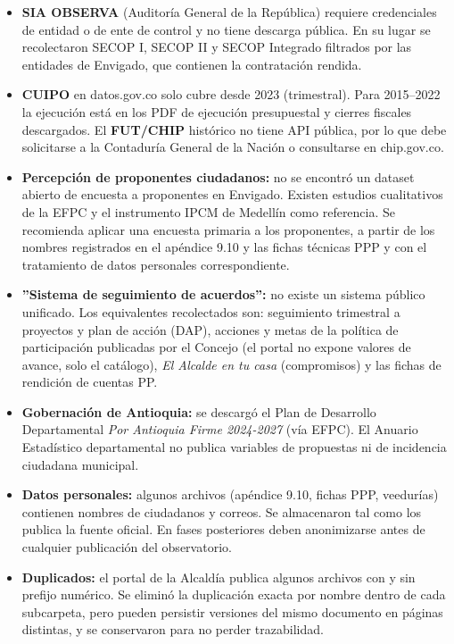 \documentclass[11pt,a4paper]{article}
\begin{document}
\begin{itemize}[leftmargin=*]
\item \textbf{SIA OBSERVA} (Auditoría General de la República) requiere credenciales de entidad o de ente de control y no tiene descarga pública. En su lugar se recolectaron SECOP I, SECOP II y SECOP Integrado filtrados por las entidades de Envigado, que contienen la contratación rendida.
\item \textbf{CUIPO} en datos.gov.co solo cubre desde 2023 (trimestral). Para 2015–2022 la ejecución está en los PDF de ejecución presupuestal y cierres fiscales descargados. El \textbf{FUT/CHIP} histórico no tiene API pública, por lo que debe solicitarse a la Contaduría General de la Nación o consultarse en chip.gov.co.
\item \textbf{Percepción de proponentes ciudadanos:} no se encontró un dataset abierto de encuesta a proponentes en Envigado. Existen estudios cualitativos de la EFPC y el instrumento IPCM de Medellín como referencia. Se recomienda aplicar una encuesta primaria a los proponentes, a partir de los nombres registrados en el apéndice 9.10 y las fichas técnicas PPP y con el tratamiento de datos personales correspondiente.
\item \textbf{''Sistema de seguimiento de acuerdos'':} no existe un sistema público unificado. Los equivalentes recolectados son: seguimiento trimestral a proyectos y plan de acción (DAP), acciones y metas de la política de participación publicadas por el Concejo (el portal no expone valores de avance, solo el catálogo), \emph{El Alcalde en tu casa} (compromisos) y las fichas de rendición de cuentas PP.
\item \textbf{Gobernación de Antioquia:} se descargó el Plan de Desarrollo Departamental \emph{Por Antioquia Firme 2024-2027} (vía EFPC). El Anuario Estadístico departamental no publica variables de propuestas ni de incidencia ciudadana municipal.
\item \textbf{Datos personales:} algunos archivos (apéndice 9.10, fichas PPP, veedurías) contienen nombres de ciudadanos y correos. Se almacenaron tal como los publica la fuente oficial. En fases posteriores deben anonimizarse antes de cualquier publicación del observatorio.
\item \textbf{Duplicados:} el portal de la Alcaldía publica algunos archivos con y sin prefijo numérico. Se eliminó la duplicación exacta por nombre dentro de cada subcarpeta, pero pueden persistir versiones del mismo documento en páginas distintas, y se conservaron para no perder trazabilidad.

\end{itemize}
\end{document}
